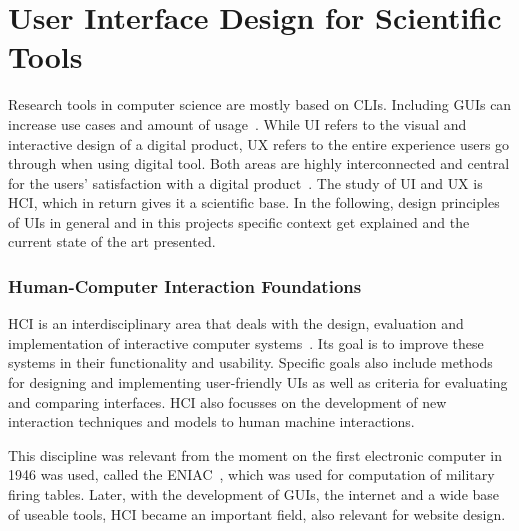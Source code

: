 \section{User Interface Design for Scientific Tools}


Research tools in computer science are mostly based on \acp{CLI}. Including \acp{GUI} can increase use cases and amount of usage~\cite{sampath_accessibility_2021}.
While \ac{UI} refers to the visual and interactive design of a digital product, \ac{UX} refers to the entire experience users go through when using digital tool. Both areas are highly interconnected and central for the users' satisfaction with a digital product~\cite{hamidli_introduction_2023}. %
The study of \ac{UI} and \ac{UX} is \ac{HCI}, which in return gives it a scientific base. 
In the following, design principles of \acp{UI} in general and in this projects specific context get explained and the current state of the art presented.  %


\subsubsection*{Human-Computer Interaction Foundations}
\ac{HCI} is an interdisciplinary area that deals with the design, evaluation and implementation of interactive computer systems~\cite{sinha_human_2010}. Its goal is to improve these systems in their functionality and usability. 
Specific goals also include methods for designing and implementing user-friendly \acp{UI} as well as criteria for evaluating and comparing interfaces. \ac{HCI} also focusses on the development of new interaction techniques and models to human machine interactions. 

This discipline was relevant from the moment on the first electronic computer in 1946 was used, called the \ac{ENIAC}~\cite{goldstine_electronic_1996}, which was used for computation of military firing tables. Later, with the development of \acp{GUI}, the internet and a wide base of useable tools, \ac{HCI} became an important field, also relevant for website design.

